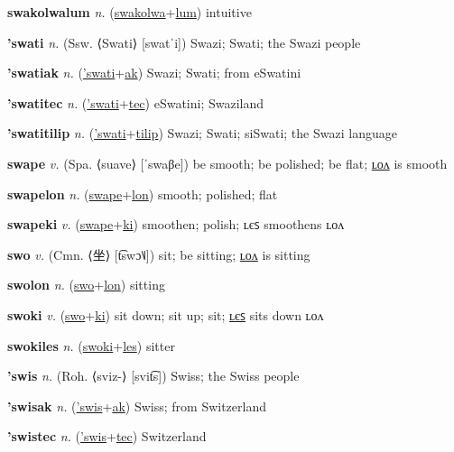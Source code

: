 \textbf{\hypertarget{swakolwalum}{swakolwalum}} \textit{n.} (\hyperlink{swakolwa}{swakolwa}+\allowbreak \hyperlink{lum}{lum})
intuitive

\textbf{\hypertarget{'swati}{'swati}} \textit{n.} (Ssw. ⟨Swati⟩ [swatˈi])
Swazi; Swati; the Swazi people

\textbf{\hypertarget{'swatiak}{'swatiak}} \textit{n.} (\hyperlink{'swati}{'swati}+\allowbreak \hyperlink{ak}{ak})
Swazi; Swati; from eSwatini

\textbf{\hypertarget{'swatitec}{'swatitec}} \textit{n.} (\hyperlink{'swati}{'swati}+\allowbreak \hyperlink{tec}{tec})
eSwatini; Swaziland

\textbf{\hypertarget{'swatitilip}{'swatitilip}} \textit{n.} (\hyperlink{'swati}{'swati}+\allowbreak \hyperlink{tilip}{tilip})
Swazi; Swati; siSwati; the Swazi language

\textbf{\hypertarget{swape}{swape}} \textit{v.} (Spa. ⟨suave⟩ [ˈswaβe])
be smooth; be polished; be flat; \hyperlink{swapelon}{ʟᴏᴧ} is smooth

\textbf{\hypertarget{swapelon}{swapelon}} \textit{n.} (\hyperlink{swape}{swape}+\allowbreak \hyperlink{lon}{lon})
smooth; polished; flat

\textbf{\hypertarget{swapeki}{swapeki}} \textit{v.} (\hyperlink{swape}{swape}+\allowbreak \hyperlink{ki}{ki})
smoothen; polish; ʟєꜱ smoothens ʟᴏᴧ

\textbf{\hypertarget{swo}{swo}} \textit{v.} (Cmn. ⟨{\chinese{}坐}⟩ [t͡swɔ˥˩])
sit; be sitting; \hyperlink{swolon}{ʟᴏᴧ} is sitting

\textbf{\hypertarget{swolon}{swolon}} \textit{n.} (\hyperlink{swo}{swo}+\allowbreak \hyperlink{lon}{lon})
sitting

\textbf{\hypertarget{swoki}{swoki}} \textit{v.} (\hyperlink{swo}{swo}+\allowbreak \hyperlink{ki}{ki})
sit down; sit up; sit; \hyperlink{swokiles}{ʟєꜱ} sits down ʟᴏᴧ

\textbf{\hypertarget{swokiles}{swokiles}} \textit{n.} (\hyperlink{swoki}{swoki}+\allowbreak \hyperlink{les}{les})
sitter

\textbf{\hypertarget{'swis}{'swis}} \textit{n.} (Roh. ⟨sviz-⟩ [svit͡s])
Swiss; the Swiss people

\textbf{\hypertarget{'swisak}{'swisak}} \textit{n.} (\hyperlink{'swis}{'swis}+\allowbreak \hyperlink{ak}{ak})
Swiss; from Switzerland

\textbf{\hypertarget{'swistec}{'swistec}} \textit{n.} (\hyperlink{'swis}{'swis}+\allowbreak \hyperlink{tec}{tec})
Switzerland

